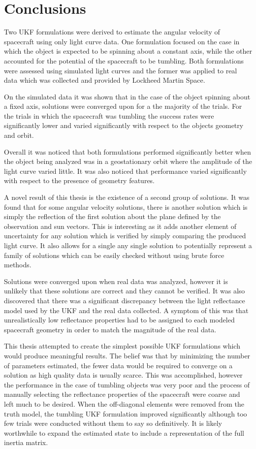 \chapter{Conclusions}

Two UKF formulations were derived to estimate the angular velocity of spacecraft using only light curve data. One formulation focused on the case in which the object is expected to be spinning about a constant axis, while the other accounted for the potential of the spacecraft to be tumbling. Both formulations were assessed using simulated light curves and the former was applied to real data which was collected and provided by Lockheed Martin Space. 

On the simulated data it was shown that in the case of the object spinning about a fixed axis, solutions were converged upon for a the majority of the trials. For the trials in which the spacecraft was tumbling the success rates were significantly lower and varied significantly with respect to the objects geometry and orbit. 

Overall it was noticed that both formulations performed significantly better when the object being analyzed was in a geostationary orbit where the amplitude of the light curve varied little. It was also noticed that performance varied significantly with respect to the presence of geometry features. 

A novel result of this thesis is the existence of a second group of solutions. It was found that for some angular velocity solutions, there is another solution which is simply the reflection of the first solution about the plane defined by the observation and sun vectors. This is interesting as it adds another element of uncertainty for any solution which is verified by simply comparing the produced light curve. It also allows for a single any single solution to potentially represent a family of solutions which can be easily checked without using brute force methods.

Solutions were converged upon when real data was analyzed, however it is unlikely that these solutions are correct and they cannot be verified. It was also discovered that there was a significant discrepancy between the light reflectance model used by the UKF and the real data collected. A symptom of this was that unrealistically low reflectance properties had to be assigned to each modeled spacecraft geometry in order to match the magnitude of the real data.

This thesis attempted to create the simplest possible UKF formulations which would produce meaningful results. The belief was that by minimizing the number of parameters estimated, the fewer data would be required to converge on a solution as high quality data is usually scarce. This was accomplished, however the performance in the case of tumbling objects was very poor and the process of manually selecting the reflectance properties of the spacecraft were coarse and left much to be desired. When the off-diagonal elements were removed from the truth model, the tumbling UKF formulation improved significantly although too few trials were conducted without them to say so definitively. It is likely worthwhile to expand the estimated state to include a representation of the full inertia matrix.


